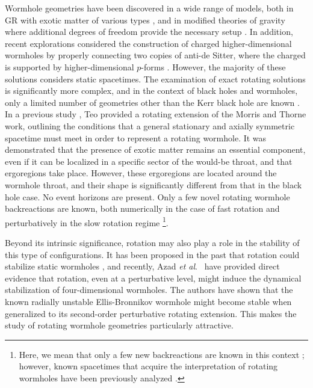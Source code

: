 \documentclass[aps,preprint,groupedaddress,nofootinbib,superscriptaddress,showkeys,showpacs,eqsecnum,amsmath,amssymb]{revtex4-1}
\begin{document}
Wormhole geometries have been discovered in a wide range of models, both in GR with exotic matter of various types \cite{Hochberg:1996ee,Konoplya:2021hsm,Lobo:2005us,Bronnikov:2005gm}, and in modified theories of gravity where additional degrees of freedom provide the necessary setup \cite{Lobo:2009ip,Antoniou:2019awm,Bronnikov:2013coa,Bronnikov:2015pha,Korolev:2014hwa,Harko:2013yb,Rahman:2023swz}. In addition, recent explorations considered the construction of charged higher-dimensional wormholes by properly connecting two copies of anti-de Sitter, where the charged is supported by higher-dimensional $p$-forms \cite{Deshpande:2022zfm}.
However, the majority of these solutions considers static spacetimes. The examination of exact rotating solutions is significantly more complex, and in the context of black holes and wormholes, only a limited number of geometries other than the Kerr black hole are known \cite{Stephani:2003tm}. In a previous study \cite{Teo:1998dp}, Teo provided a rotating extension of the Morris and Thorne work, outlining the conditions that a general stationary and axially symmetric spacetime must meet in order to represent a rotating wormhole. It was demonstrated that the presence of exotic matter remains an essential component, even if it can be localized in a specific sector of the would-be throat, and that ergoregions take place. However, these ergoregions are located around the wormhole throat, and their shape is significantly different from that in the black hole case. No event horizons are present. Only a few novel rotating wormhole backreactions are known, both numerically in the case of fast rotation and perturbatively in the slow rotation regime \cite{Kashargin:2007mm,Kashargin:2008pk,Kleihaus:2014dla,Chew:2016epf}\footnote{Here, we mean that only a few new backreactions are known in this context \cite{Matos:2010pcd,DelAguila:2015isj}; however, known spacetimes that acquire the interpretation of rotating wormholes have been previously analyzed \cite{Clement:2022pjr,Anabalon:2018rzq}.}.

Beyond its intrinsic significance, rotation may also play a role in the stability of this type of configurations. It has been proposed in the past that rotation could stabilize static wormholes \cite{Matos:2005uh}, and recently, Azad \emph{et al}.~\cite{Azad:2023iju} have provided direct evidence that rotation, even at a perturbative level, might induce the dynamical stabilization of four-dimensional wormholes. The authors have shown that the known radially unstable Ellis-Bronnikov wormhole \cite{Ellis:1973yv,Bronnikov:1973fh} might become stable when generalized to its second-order perturbative rotating extension. This makes the study of rotating wormhole geometries particularly attractive.\\
\end{document}
